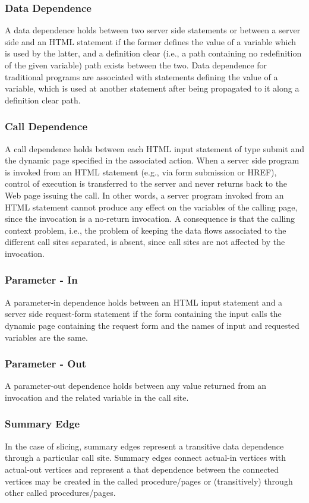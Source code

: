 \documentclass[11pt]{article}   %
\begin{document}
\subsubsection{Data Dependence}
A data dependence holds between two server side statements or between a server side and an HTML statement if the former defines the value of a variable which is used by the latter, and a definition clear (i.e., a path containing no redefinition of the given variable) path exists between the two.
Data dependence for traditional programs are associated with statements defining the value of a variable, which is used at another statement after being propagated to it along a definition clear path.\cite{ricca2001web}
\subsubsection{Call Dependence}
A call dependence holds between each HTML input statement of type submit and the dynamic page specified in the associated action.
When a server side program is invoked from an HTML statement (e.g., via form submission or HREF), control of execution is transferred to the server and never returns back to the Web page issuing the call. In other words, a server program invoked from an HTML statement cannot produce any effect on the variables of the calling page, since the invocation is a no-return invocation. A consequence is that the calling context problem, i.e., the problem of keeping the data flows associated to the different call sites separated, is absent, since call sites are not affected by the invocation\cite{ricca2001web}.
\subsubsection{Parameter - In}
A parameter-in dependence holds between an HTML input statement and a server side request-form statement if the form containing the input calls the dynamic page containing the request form and the names of input and requested variables are the same\cite{ricca2001web}.
\subsubsection{Parameter - Out}
A parameter-out dependence holds between any value returned from an invocation and the related variable in the call site.
\subsubsection{Summary Edge}
In the case of slicing, summary edges represent a transitive data dependence through a particular call
site. Summary edges connect actual-in vertices with actual-out vertices and represent a that dependence
between the connected vertices may be created in the called procedure/pages or (transitively) through other called
procedures/pages.
\end{document}
